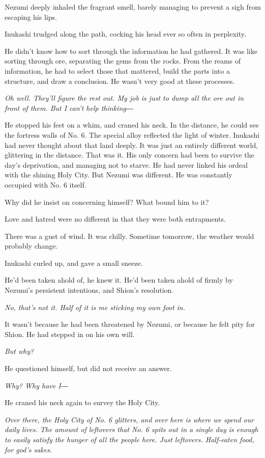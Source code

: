 Nezumi deeply inhaled the fragrant smell, barely managing to prevent a
sigh from escaping his lips.

Inukashi trudged along the path, cocking his head ever so often in
perplexity.

He didn't know how to sort through the information he had gathered. It
was like sorting through ore, separating the gems from the rocks. From
the reams of information, he had to select those that mattered, build
the parts into a structure, and draw a conclusion. He wasn't very good
at these processes.

\emph{Oh well. They'll figure the rest out. My job is just to dump all the ore
out in front of them. But I can't help thinking―}

He stopped his feet on a whim, and craned his neck. In the distance, he
could see the fortress walls of No. 6. The special alloy reflected the
light of winter. Inukashi had never thought about that land deeply. It
was just an entirely different world, glittering in the distance. That
was it. His only concern had been to survive the day's deprivation, and
managing not to starve. He had never linked his ordeal with the shining
Holy City. But Nezumi was different. He was constantly occupied with No.
6 itself.

Why did he insist on concerning himself? What bound him to it?

Love and hatred were no different in that they were both entrapments.

There was a gust of wind. It was chilly. Sometime tomorrow, the weather
would probably change.

Inukashi curled up, and gave a small sneeze.

He'd been taken ahold of, he knew it. He'd been taken ahold of firmly by
Nezumi's persistent intentions, and Shion's resolution.

\emph{No, that's not it. Half of it is me sticking my own foot in.}

It wasn't because he had been threatened by Nezumi, or because he felt
pity for Shion. He had stepped in on his own will.

\emph{But why?}

He questioned himself, but did not receive an answer.

\emph{Why? Why have I―}

He craned his neck again to survey the Holy City.

\emph{Over there, the Holy City of No. 6 glitters, and over here is where we
spend our daily lives. The amount of leftovers that No. 6 spits out in a
single day is enough to easily satisfy the hunger of all the people
here. Just leftovers. Half-eaten food, for god's sakes.}

